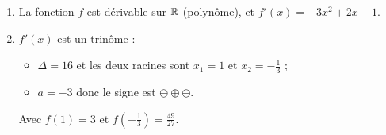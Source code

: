 \documentclass[a4paper,11pt]{article}
\begin{document}

\begin{enumerate}
	\item La fonction $f$ est dérivable sur $\R$ (polynôme), et $f'(x)=-3x^2+2x+1$.
	\item $f'(x)$ est un trinôme :
	\begin{itemize}
		\item $\Delta=16$ et les deux racines sont $x_1=1$ et $x_2=-\tfrac13$ ;
		\item $a=-3$ donc le signe est $\ominus\oplus\ominus$.
	\end{itemize}
	\begin{center}
		
		Avec $f(1)=3$ et $f\left(-\tfrac13\right)=\tfrac{49}{27}$.
	\end{center}
\end{enumerate}

\medskip

\end{document}
